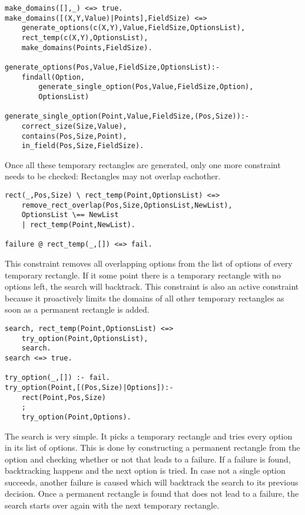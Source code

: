 \begin{lstlisting}
make_domains([],_) <=> true.
make_domains([(X,Y,Value)|Points],FieldSize) <=>
	generate_options(c(X,Y),Value,FieldSize,OptionsList),
	rect_temp(c(X,Y),OptionsList),
	make_domains(Points,FieldSize).
	
generate_options(Pos,Value,FieldSize,OptionsList):-
    findall(Option,
		generate_single_option(Pos,Value,FieldSize,Option),
		OptionsList)
		
generate_single_option(Point,Value,FieldSize,(Pos,Size)):-
	correct_size(Size,Value),
	contains(Pos,Size,Point),
	in_field(Pos,Size,FieldSize).
\end{lstlisting}

Once all these temporary rectangles are generated, only one more constraint needs to be checked: Rectangles may not overlap eachother.

\begin{lstlisting}
rect(_,Pos,Size) \ rect_temp(Point,OptionsList) <=>
	remove_rect_overlap(Pos,Size,OptionsList,NewList),
	OptionsList \== NewList
	| rect_temp(Point,NewList).
	
failure @ rect_temp(_,[]) <=> fail.

\end{lstlisting}


This constraint removes all overlapping options from the list of options of every temporary rectangle. If it some point there is a temporary rectangle with no options left, the search will backtrack. This constraint is also an active constraint because it proactively limits the domains of all other temporary rectangles as soon as a permanent rectangle is added.
\begin{lstlisting}
search, rect_temp(Point,OptionsList) <=>
	try_option(Point,OptionsList),
	search.
search <=> true.

try_option(_,[]) :- fail.
try_option(Point,[(Pos,Size)|Options]):-
    rect(Point,Pos,Size)
    ;
    try_option(Point,Options).
\end{lstlisting}

The search is very simple. It picks a temporary rectangle and tries every option in its list of options. This is done by constructing a permanent rectangle from the option and checking whether or not that leads to a failure. If a failure is found, backtracking happens and the next option is tried. In case not a single option succeeds, another failure is caused which will backtrack the search to its previous decision. Once a permanent rectangle is found that does not lead to a failure, the search starts over again with the next temporary rectangle.

